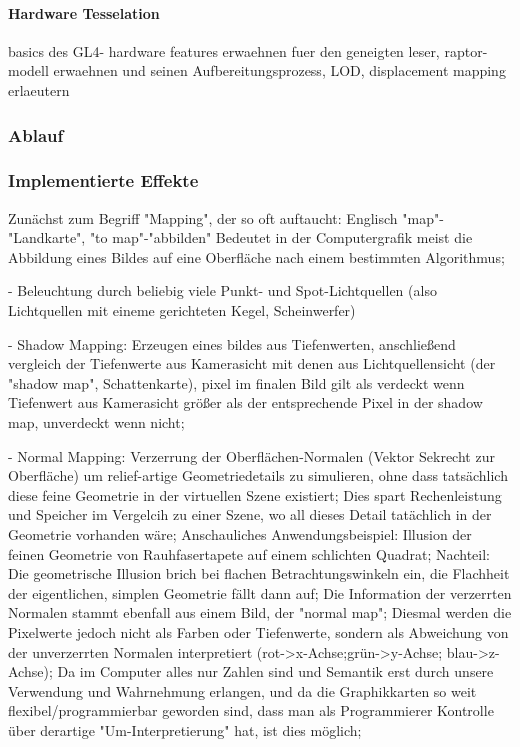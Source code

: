 	
	
	\paragraph{Hardware Tesselation}
	basics des GL4- hardware features erwaehnen fuer den geneigten leser, raptor-modell erwaehnen und seinen 		
	Aufbereitungsprozess, LOD, displacement mapping erlaeutern	
	
	
\subsubsection{Ablauf}	

	
\subsubsection{Implementierte Effekte}
	\label{sec:genericVisualEffects}

Zunächst zum Begriff "Mapping", der so oft auftaucht: Englisch "map"-"Landkarte", "to map"-"abbilden" Bedeutet in der Computergrafik meist die Abbildung eines Bildes auf eine Oberfläche nach einem bestimmten Algorithmus;

- Beleuchtung durch beliebig viele Punkt- und Spot-Lichtquellen (also Lichtquellen mit eineme gerichteten Kegel, Scheinwerfer)

- Shadow Mapping: Erzeugen eines bildes aus Tiefenwerten, anschließend vergleich der Tiefenwerte aus Kamerasicht mit denen aus Lichtquellensicht (der "shadow map", Schattenkarte), pixel im finalen Bild gilt als verdeckt wenn Tiefenwert aus Kamerasicht größer als der entsprechende Pixel in der shadow map, unverdeckt wenn nicht;

- Normal Mapping: Verzerrung der Oberflächen-Normalen (Vektor Sekrecht zur Oberfläche) um relief-artige Geometriedetails zu simulieren, ohne dass tatsächlich diese feine Geometrie in der virtuellen Szene existiert; Dies spart Rechenleistung und Speicher im Vergelcih zu einer Szene, wo all dieses Detail tatächlich in der Geometrie vorhanden wäre; Anschauliches Anwendungsbeispiel: Illusion der feinen Geometrie von Rauhfasertapete auf einem schlichten Quadrat; Nachteil: Die geometrische Illusion brich bei flachen Betrachtungswinkeln ein, die Flachheit der eigentlichen, simplen Geometrie fällt dann auf; Die Information der verzerrten Normalen stammt ebenfall aus einem Bild, der "normal map"; Diesmal werden die Pixelwerte jedoch nicht als Farben oder Tiefenwerte, sondern als Abweichung von der unverzerrten Normalen interpretiert (rot->x-Achse;grün->y-Achse; blau->z-Achse); Da im Computer alles nur Zahlen sind und Semantik erst durch unsere Verwendung und Wahrnehmung erlangen, und da die Graphikkarten so weit flexibel/programmierbar geworden sind, dass man als Programmierer Kontrolle über derartige "Um-Interpretierung" hat, ist dies möglich;

